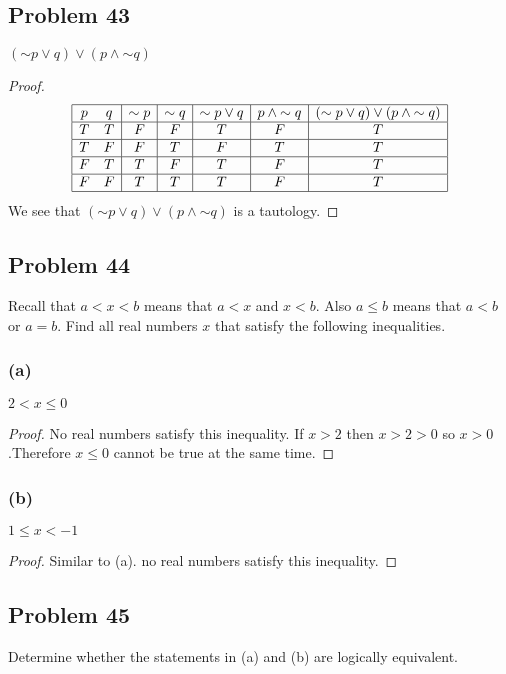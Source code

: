 \documentclass[14pt]{extarticle}
\begin{document}
\subsection{Problem 43}
$({\sim p} \vee q) \vee (p \wedge {\sim q})$

\begin{proof}
$$
\begin{array}{|cc|c|c|c|c|c|}
\hline
p & q & {\sim p} & {\sim q} & {\sim p} \vee q & p \wedge {\sim q} &
({\sim p} \vee q) \vee (p \wedge {\sim q}) \\
\hline
T & T & F & F & T & F & T \\
\hline
T & F & F & T & F & T & T \\
\hline
F & T & T & F & T & F & T \\
\hline
F & F & T & T & T & F & T \\
\hline
\end{array}
$$
We see that $({\sim p} \vee q) \vee (p \wedge {\sim q})$ is a tautology.
\end{proof}

\subsection{Problem 44}
Recall that $a < x < b$ means that $a < x$ and $x < b$. Also $a \leq b$ means that $a < b$ or $a = b$. Find all real numbers $x$ that satisfy the following inequalities.

\subsubsection{(a)}
$2 < x \leq 0$

\begin{proof}
No real numbers satisfy this inequality. If $x > 2$ then $x > 2 > 0$ so $x > 0$.Therefore $x \leq 0$ cannot be true at the same time.
\end{proof}

\subsubsection{(b)}
$1 \leq x < -1$

\begin{proof}
Similar to (a). no real numbers satisfy this inequality.
\end{proof}

\subsection{Problem 45}
Determine whether the statements in (a) and (b) are logically equivalent.
\end{document}
